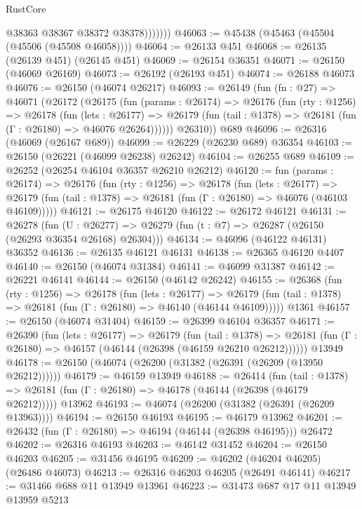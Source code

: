 \begin{lexlean}{RustCore}
\begin{coremodule}
                  @38363
                  @38367
                  @38372
                  @38378)))))))
@46063 := @45438 (@45463 (@45504 (@45506 (@45508 @46058))))
@46064 := @26133 @451
@46068 := @26135 (@26139 @451) (@26145 @451)
@46069 := @26154 @36351
@46071 := @26150 (@46069 @26169)
@46073 := @26192 (@26193 @451)
@46074 := @26188 @46073
@46076 := @26150 (@46074 @26217)
@46093 := @26149
    (fun (fn : @27) =>
    @46071
      (@26172
        (@26175
          (fun (params : @26174) =>
          @26176
            (fun (rty : @1256) =>
            @26178
              (fun (lets : @26177) =>
              @26179 (fun (tail : @1378) => @26181 (fun (Γ : @26180) => @46076 @26264))))))
        @26310))
    @689
@46096 := @26316 (@46069 (@26167 @689))
@46099 := @26229 (@26230 @689) @36354
@46103 := @26150 (@26221 (@46099 @26238) @26242)
@46104 := @26255 @689
@46109 := @26252 (@26254 @46104 @36357 @26210 @26212)
@46120 := fun (params : @26174) =>
  @26176
    (fun (rty : @1256) =>
    @26178
      (fun (lets : @26177) =>
      @26179 (fun (tail : @1378) => @26181 (fun (Γ : @26180) => @46076 (@46103 @46109)))))
@46121 := @26175 @46120
@46122 := @26172 @46121
@46131 := @26278
    (fun (U : @26277) => @26279 (fun (t : @7) => @26287 (@26150 (@26293 @36354 @26168) @26304)))
@46134 := @46096 (@46122 @46131) @36352
@46136 := @26135 @46121 @46131
@46138 := @26365 @46120 @4407
@46140 := @26150 (@46074 @31384)
@46141 := @46099 @31387
@46142 := @26221 @46141
@46144 := @26150 (@46142 @26242)
@46155 := @26368
    (fun (rty : @1256) =>
    @26178
      (fun (lets : @26177) =>
      @26179 (fun (tail : @1378) => @26181 (fun (Γ : @26180) => @46140 (@46144 @46109)))))
    @1361
@46157 := @26150 (@46074 @31404)
@46159 := @26399 @46104 @36357
@46171 := @26390
    (fun (lets : @26177) =>
    @26179
      (fun (tail : @1378) =>
      @26181 (fun (Γ : @26180) => @46157 (@46144 (@26398 (@46159 @26210 @26212))))))
    @13949
@46178 := @26150 (@46074 (@26200 (@31382 (@26391 (@26209 (@13950 @26212))))))
@46179 := @46159 @13949
@46188 := @26414
    (fun (tail : @1378) => @26181 (fun (Γ : @26180) => @46178 (@46144 (@26398 (@46179 @26212)))))
    @13962
@46193 := @46074 (@26200 (@31382 (@26391 (@26209 @13963))))
@46194 := @26150 @46193
@46195 := @46179 @13962
@46201 := @26432 (fun (Γ : @26180) => @46194 (@46144 (@26398 @46195))) @26472
@46202 := @26316 @46193
@46203 := @46142 @31452
@46204 := @26150 @46203
@46205 := @31456 @46195
@46209 := @46202 (@46204 @46205) (@26486 @46073)
@46213 := @26316 @46203 @46205 (@26491 @46141)
@46217 := @31466 @688 @11 @13949 @13961
@46223 := @31473 @687 @17 @11 @13949 @13959 @5213

\end{coremodule}
\end{lexlean}
